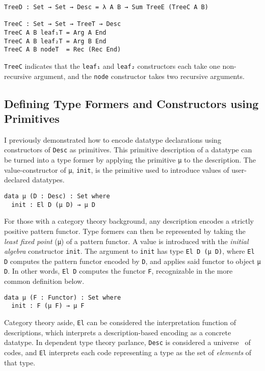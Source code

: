 \documentclass[runningheads,a4paper]{llncs}
\begin{document}
\begin{verbatim}
TreeD : Set → Set → Desc = λ A B → Sum TreeE (TreeC A B)

TreeC : Set → Set → TreeT → Desc
TreeC A B leaf₁T = Arg A End
TreeC A B leaf₂T = Arg B End
TreeC A B nodeT  = Rec (Rec End)
\end{verbatim}

{\tt TreeC} indicates that the {\tt leaf₁} and {\tt leaf₂}
constructors each take one non-recursive argument,
and the {\tt node} constructor takes two recursive arguments.

\subsection{Defining Type Formers and Constructors using Primitives}

I previously demonstrated how to encode datatype declarations using
constructors of {\tt Desc} as primitives. This primitive description
of a datatype can be turned into a type former by
applying the primitive {\tt μ} to the description. The value-constructor of
{\tt μ}, {\tt init}, is the primitive used to introduce values of
user-declared datatypes.

\begin{verbatim}
data μ (D : Desc) : Set where
  init : El D (μ D) → μ D
\end{verbatim}

For those with a category theory background, any description encodes a
strictly positive pattern functor. Type formers can then be
represented by taking the {\it least fixed point} ({\tt μ}) of a pattern functor. A
value is introduced with the {\it initial algebra} constructor {\tt init}.
The argument to {\tt init} has type {\tt El D (μ D)}, where
{\tt El D} computes the pattern functor encoded by {\tt D}, and
applies said functor to object {\tt μ D}. In other words, {\tt El D}
computes the functor {\tt F}, recognizable in the more common
definition below.

\begin{verbatim}
data μ (F : Functor) : Set where
  init : F (μ F) → μ F
\end{verbatim}

Category theory aside, {\tt El} can be considered the interpretation
function of descriptions, which interprets a description-based encoding
as a concrete datatype. In dependent type theory parlance, {\tt Desc}
is considered a universe~\cite{martin1975intuitionistic} of codes, and {\tt El} interprets each
code representing a type as the set of {\it elements} of that type.
\end{document}
